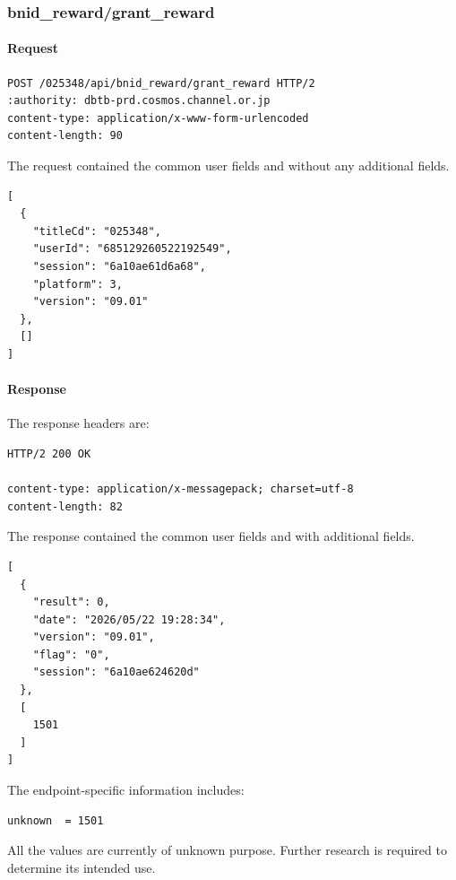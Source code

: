 \subsubsection{bnid\_reward/grant\_reward}
\label{subsec:api_bnid_reward_grant_reward}

\paragraph{Request}

\begin{lstlisting}
POST /025348/api/bnid_reward/grant_reward HTTP/2
:authority: dbtb-prd.cosmos.channel.or.jp
content-type: application/x-www-form-urlencoded
content-length: 90
\end{lstlisting}

The request contained the common user fields and without any additional fields.

\begin{lstlisting}
[
  {
    "titleCd": "025348",
    "userId": "685129260522192549",
    "session": "6a10ae61d6a68",
    "platform": 3,
    "version": "09.01"
  },
  []
]
\end{lstlisting}

\newpage

\paragraph{Response}

The response headers are:

\begin{lstlisting}
HTTP/2 200 OK

content-type: application/x-messagepack; charset=utf-8
content-length: 82
\end{lstlisting}

The response contained the common user fields and with additional fields.

\begin{lstlisting}
[
  {
    "result": 0,
    "date": "2026/05/22 19:28:34",
    "version": "09.01",
    "flag": "0",
    "session": "6a10ae624620d"
  },
  [
    1501
  ]
]
\end{lstlisting}

The endpoint-specific information includes:

\begin{lstlisting}
unknown  = 1501
\end{lstlisting}

\begin{tcolorbox}[colback=yellow!10,colframe=orange!80!black,title=Warning]
All the values are currently of unknown purpose.
Further research is required to determine its intended use.
\end{tcolorbox}

\newpage